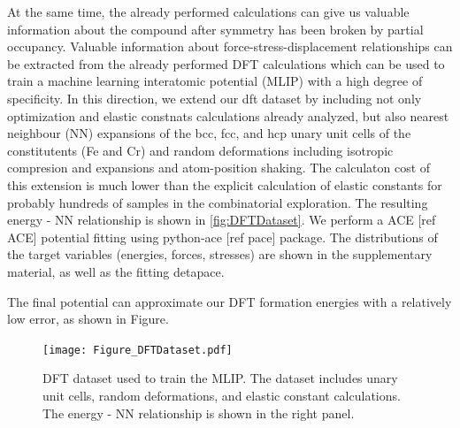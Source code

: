 \documentclass[superscriptaddress, 12pt]{revtex4-2}%
\newcommand{\MFnew}[1]{{\color{purple} #1}}
\begin{document}
At the same time, the already performed calculations can give us valuable information about the compound after symmetry has been broken by partial occupancy. 
Valuable information about force-stress-displacement relationships can be extracted from the already performed DFT calculations which can be used to train a machine learning interatomic potential (MLIP) with a high degree of specificity. 
In this direction, we extend our dft dataset by including not only optimization and elastic constnats calculations already analyzed, but also nearest neighbour (NN) expansions of the bcc, fcc, and hcp unary unit cells of the constitutents (Fe and Cr) and random deformations including isotropic compresion and expansions and atom-position shaking.
The calculaton cost of this extension is much lower than the explicit calculation of elastic constants for probably hundreds of samples in the combinatorial exploration.
The resulting energy - NN relationship is shown in \autoref{fig:DFTDataset}.
We perform a ACE\MFnew{[ref ACE]} potential fitting using python-ace\MFnew{[ref pace]} package.
The distributions of the target variables (energies, forces, stresses) are shown in the supplementary material, as well as the fitting detapace.

The final potential can approximate our DFT formation energies with a relatively low error, as shown in \MFnew{Figure}.

\begin{figure}[H]
  \texttt{[image: Figure\_DFTDataset.pdf]}
  \caption{\protect\label{fig:DFTDataset}
		DFT dataset used to train the MLIP.
		The dataset includes unary unit cells, random deformations, and elastic constant calculations.
		The energy - NN relationship is shown in the right panel.
	}

\end{figure}
\end{document}
